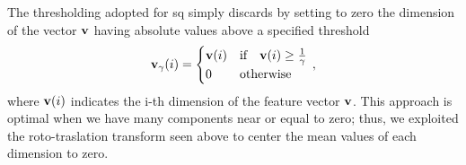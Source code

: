 The thresholding adopted for \gls{sq} simply discards by setting to zero the dimension of the vector $\mathbf{v}$ having absolute values above a specified threshold
\begin{equation}
\mathbf{v}_{\gamma} (i) = \begin{cases}
                    \mathbf{v} (i) & \text{if} \quad \mathbf{v} (i) \geq \frac{1}{\gamma} \\
                    0      & \text{otherwise}
                  \end{cases} \,,
\end{equation}
where $\mathbf{v}(i)$ indicates the i-th dimension of the feature vector $\mathbf{v}$.
This approach is optimal when we have many components near or equal to zero;
thus, we exploited the roto-traslation transform seen above to center the mean values of each dimension to zero.




